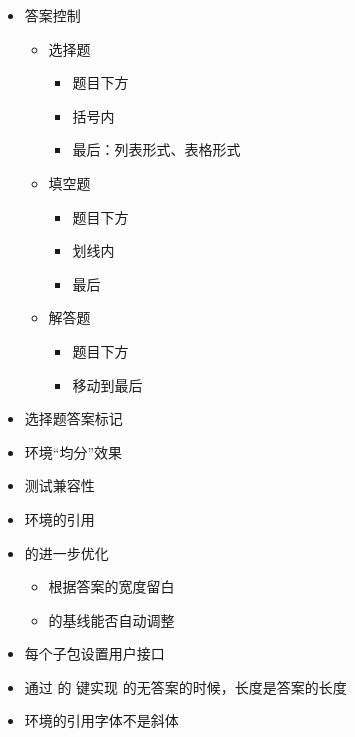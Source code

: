 \documentclass{xdyydoc}
\begin{document}
\begin{itemize}
  \item 答案控制
    \begin{itemize}
      \item 选择题
        \begin{itemize}
          \item 题目下方
          \item 括号内
          \item 最后：列表形式、表格形式
        \end{itemize}
      \item 填空题
        \begin{itemize}
          \item 题目下方
          \item 划线内
          \item 最后
        \end{itemize}
      \item 解答题
        \begin{itemize}
          \item 题目下方
          \item 移动到最后
        \end{itemize}
    \end{itemize}
  \item 选择题答案标记
  \item {} 环境“均分”效果
  \item 测试兼容性
  \item {} 环境的引用
  \item {} 的进一步优化
    \begin{itemize}
      \item 根据答案的宽度留白
      \item {} 的基线能否自动调整
    \end{itemize}
  \item 每个子包设置用户接口
  \item 通过  的  键实现  的无答案的时候，长度是答案的长度
  \item {} 环境的引用字体不是斜体
\end{itemize}
\end{document}
